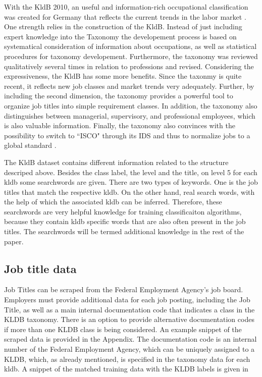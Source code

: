 \documentclass[12pt, a4paper, titlepage]{article}
\begin{document}
With the \ac{KldB} 2010, an useful and information-rich occupational classification was created for Germany that reflects the current trends in the labor market \citep{Paulus2013}. One strength relies in the construction of the \ac{KldB}. Instead of just including expert knowledge into the Taxonomy the developement process is based on systematical consideration of information about occupations, as well as statistical procedures for taxonomy developement. Furthermore, the taxonomy was reviewed qualitatively several times in relation to professions and revised. Considering the expressiveness, the \ac{KldB} has some more benefits. Since the taxonmy is quite recent, it reflects new job classes and market trends very adequately. Further, by including the second dimension, the taxonomy provides a powerful tool to organize job titles into simple requirement classes.  In addition, the taxonomy also distinguishes between managerial, supervisory, and professional employees, which is also valuable information. Finally, the taxonomy also convinces with the possibility to switch to ``\ac{ISCO}" through its IDS and thus to normalize jobs to a global standard \citep{Bundesagentur2011b}.

The \ac{KldB} dataset contains different information related to the structure descriped above. Besides the class label, the level and the title, on level 5 for each kldb some searchwords are given. There are two types of keywords. One is the job titles that match the respective kldb. On the other hand, real search words, with the help of which the associated kldb can be inferred. Therefore, these searchwords are very helpful knowledge for training classificaiton algorithms, because they contain kldb specific words that are also often present in the job titles. The searchwords will be termed additional knowledge in the rest of the paper. 
 
\subsection{Job title data}
Job Titles can be scraped from the Federal Employment Agency's job board. Employers must provide additional data for each job posting, including the Job Title, as well as a main internal documentation code that indicates a class in the KLDB taxonomy. There is an option to provide alternative documentation codes if more than one KLDB class is being considered. An example snippet of the scraped data is provided in the Appendix. The documentation code is an internal number of the Federal Employment Agency, which can be uniquely assigned to a KLDB, which, as already mentioned, is specified in the taxonomy data for each kldb. A snippet of the matched training data with the KLDB labels is given in 
\end{document}

